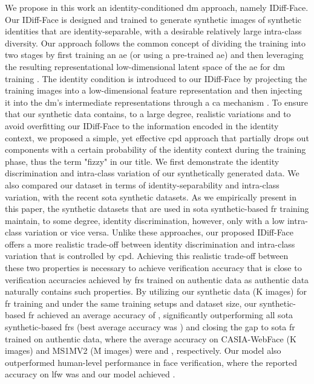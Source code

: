 \documentclass[10pt,twocolumn,letterpaper]{article}
\newcommand{\approachname}{IDiff-Face }
\newcommand{\approachnamewithoutspace}{IDiff-Face}
\begin{document}
We propose in this work an identity-conditioned \acrlong{dm} approach, namely \approachnamewithoutspace. Our \approachname is designed and trained to generate synthetic images of synthetic identities that are identity-separable, with a desirable relatively large intra-class diversity.
Our approach follows the common concept \cite{Rombach2021} of dividing the training into two stages by first training an \acrshort{ae} (or using a pre-trained \acrshort{ae}) and then leveraging the resulting representational low-dimensional latent space of the \acrshort{ae} for \acrshort{dm} training \cite{Rombach2021}.  The identity condition is introduced to our \approachname by projecting the training images into a low-dimensional feature representation and then injecting it into the \acrshort{dm}'s intermediate representations through a \acrfull{ca} mechanism \cite{Rombach2021}. To ensure that our synthetic data contains, to a large degree, realistic variations and to avoid overfitting our \approachname to the information encoded in the identity context, we proposed a simple, yet effective \acrfull{cpd} approach that partially drops out components with a certain probability of the identity context during the training phase, thus the term "fizzy" in our title. 
We first demonstrate the identity discrimination and intra-class variation of our synthetically generated data. We also compared our dataset in terms of identity-separability and intra-class variation, with the recent \acrshort{sota} synthetic datasets. As we empirically present in this paper, the synthetic datasets that are used in \acrshort{sota} synthetic-based \acrshort{fr} training maintain, to some degree, identity discrimination, however, only with a low intra-class variation or vice versa. 
Unlike these approaches, our proposed \approachname offers a more realistic trade-off between identity discrimination and intra-class variation that is controlled by \acrshort{cpd}.
Achieving this realistic trade-off between these two properties is necessary to achieve verification accuracy that is close to verification accuracies achieved by \acrshort{fr}s trained on authentic data as authentic data naturally contains such properties. By utilizing our synthetic data (K images) for \acrshort{fr} training and under the same training setups and dataset size, our synthetic-based \acrshort{fr} achieved an average accuracy of , significantly outperforming 
all \acrshort{sota} synthetic-based \acrshort{fr}s (best average accuracy was ) and closing the gap to \acrshort{sota} \acrshort{fr} trained on authentic data, where the average accuracy on CASIA-WebFace \cite{Yi2014} (K images) and MS1MV2 \cite{MSCeleb1MDataset,ArcFace} (M images) were  and , respectively.
Our model also outperformed human-level performance in face verification, where the reported accuracy on \acrfull{lfw} \cite{LFWDatabase} was  \cite{DBLP:conf/iccv/KumarBBN09} and our model achieved .
\end{document}
